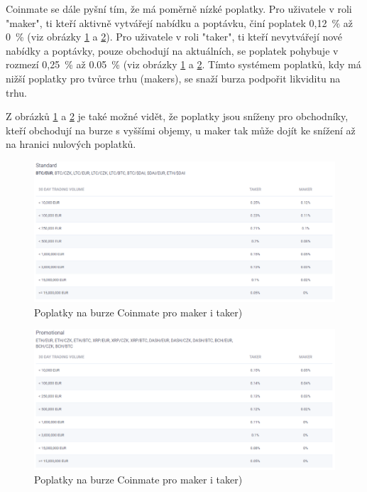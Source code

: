\documentclass[thesis=B,czech]{FITthesis}[2019/03/21]
\begin{document}
Coinmate se dále pyšní tím, že má poměrně nízké poplatky. Pro uživatele v roli "maker", ti kteří aktivně vytvářejí nabídku a poptávku, činí poplatek 0,12~\% až 0~\% (viz obrázky \ref{coinmate_standard} a \ref{coinmate_promotional}). Pro uživatele v roli "taker", ti kteří nevytvářejí nové nabídky a poptávky, pouze obchodují na aktuálních, se poplatek pohybuje v rozmezí 0,25~\% až 0.05~\% (viz obrázky \ref{coinmate_standard} a \ref{coinmate_promotional}. Tímto systémem poplatků, kdy má nižší poplatky pro tvůrce trhu (makers), se snaží burza podpořit likviditu na trhu. \cite{cryptowisser_coinmate} \cite{coinmate_fees}

Z obrázků \ref{coinmate_standard} a \ref{coinmate_promotional} je také možné vidět, že poplatky jsou sníženy pro obchodníky, kteří obchodují na burze s vyššími objemy, u maker tak může dojít ke snížení až na hranici nulových poplatků. \cite{coinmate_fees}

\begin{figure}\centering
	\includegraphics[width=1\textwidth]{images/coinmate_standard.PNG}
	\caption{Poplatky na burze Coinmate pro maker i taker) \cite{coinmate_fees}}\label{coinmate_standard}
\end{figure}
\begin{figure}\centering
	\includegraphics[width=1\textwidth]{images/coinmate_promotional.PNG}
	\caption{Poplatky na burze Coinmate pro maker i taker) \cite{coinmate_fees}}\label{coinmate_promotional}
\end{figure}
\end{document}
